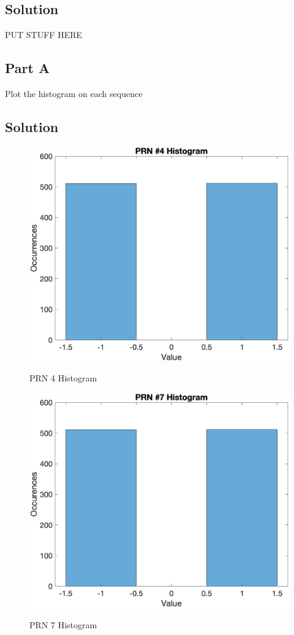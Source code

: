\documentclass{article}
\begin{document}
\subsection*{Solution}
PUT STUFF HERE

\subsection*{Part A}
Plot the histogram on each sequence

\subsection*{Solution}
\begin{figure}[H]
    \centering
    \includegraphics[width=0.75\linewidth]{../figures/p8_prn4_hist.png}\label{fig:p8_prn4_hist}
    \caption{PRN 4 Histogram }
\end{figure}

\begin{figure}[H]
    \centering
    \includegraphics[width=0.75\linewidth]{../figures/p8_prn7_hist.png}\label{fig:p8_prn7_hist}
    \caption{PRN 7 Histogram }
\end{figure}
\end{document}
